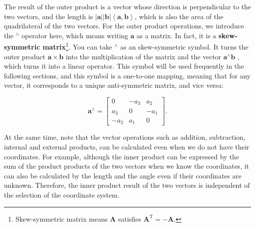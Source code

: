 The result of the outer product is a vector whose direction is perpendicular to the two vectors, and the length is $ \left | \mathbf{a} \right | \left | \mathbf{b} \right | \left \langle { \mathbf {a}, \mathbf {b}} \right \rangle  $, which is also the area of the quadrilateral of the two vectors. For the outer product operations, we introduce the $ ^ \wedge $ operator here, which means writing $ \mathbf{a} $ as a matrix. In fact, it is a \textbf {skew-symmetric matrix}\footnote{Skew-symmetric matrix means $ \mathbf{A} $ satisfies $ \mathbf{A}^ \mathrm{T}=- \mathbf{A}$. }. You can take $ ^ \wedge $ as an skew-symmetric symbol. It turns the outer product $ \mathbf{a} \times  \mathbf{b} $ into the multiplication of the matrix and the vector $ { \mathbf{a}^ \wedge } \mathbf{b} $ , which turns it into a linear operator. This symbol will be used frequently in the following sections, and this symbol is a one-to-one mapping, meaning that for any vector, it corresponds to a unique anti-symmetric matrix, and vice versa:

\begin{equation}
\mathbf{a}^\wedge = \left[ {\begin{array}{*{20}{c}}
	0&{-{a_3}}&{{a_2}}\\  
	{{a_3}}&0&{ - {a_1}}\\
	{ - {a_2}}&{{a_1}}&0
	\end{array}} \right].
\end{equation}

At the same time, note that the vector operations such as addition, subtraction, internal and external products, can be calculated even when we do not have their coordinates. For example, although the inner product can be expressed by the sum of the product products of the two vectors when we know the coordinates, it can also be calculated by the length and the angle even if their coordinates are unknown. Therefore, the inner product result of the two vectors is independent of the selection of the coordinate system.

